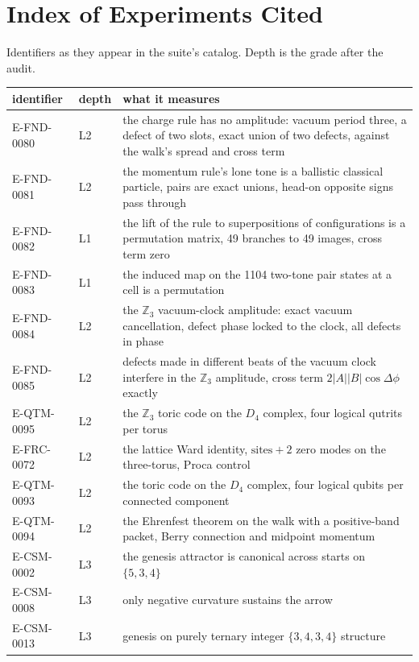 \section{Index of Experiments Cited}

Identifiers as they appear in the suite's catalog. Depth is the grade after the audit.

\begin{small}
\begin{longtable}{@{}p{3.6cm}lp{8.6cm}@{}}
\toprule
identifier & depth & what it measures \\
\midrule
E-FND-0080 & L2 & the charge rule has no amplitude: vacuum period three, a defect of two slots, exact union of two defects, against the walk's spread and cross term \\
E-FND-0081 & L2 & the momentum rule's lone tone is a ballistic classical particle, pairs are exact unions, head-on opposite signs pass through \\
E-FND-0082 & L1 & the lift of the rule to superpositions of configurations is a permutation matrix, 49 branches to 49 images, cross term zero \\
E-FND-0083 & L1 & the induced map on the 1104 two-tone pair states at a cell is a permutation \\
E-FND-0084 & L2 & the $\mathbb{Z}_3$ vacuum-clock amplitude: exact vacuum cancellation, defect phase locked to the clock, all defects in phase \\
E-FND-0085 & L2 & defects made in different beats of the vacuum clock interfere in the $\mathbb{Z}_3$ amplitude, cross term $2|A||B|\cos\Delta\phi$ exactly \\
E-QTM-0095 & L2 & the $\mathbb{Z}_3$ toric code on the $D_4$ complex, four logical qutrits per torus \\
E-FRC-0072 & L2 & the lattice Ward identity, $\text{sites} + 2$ zero modes on the three-torus, Proca control \\
E-QTM-0093 & L2 & the toric code on the $D_4$ complex, four logical qubits per connected component \\
E-QTM-0094 & L2 & the Ehrenfest theorem on the walk with a positive-band packet, Berry connection and midpoint momentum \\
E-CSM-0002 & L3 & the genesis attractor is canonical across starts on $\{5,3,4\}$ \\
E-CSM-0008 & L3 & only negative curvature sustains the arrow \\
E-CSM-0013 & L3 & genesis on purely ternary integer $\{3,4,3,4\}$ structure \\

\end{longtable}
\end{small}
